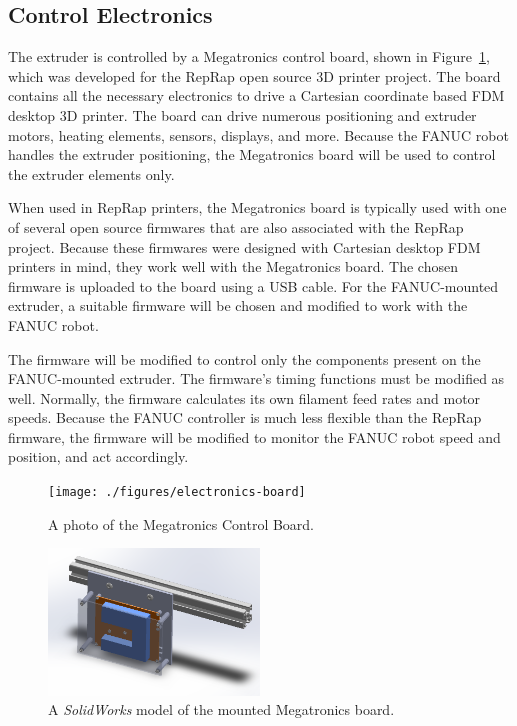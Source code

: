 \clearpage




\subsection{Control Electronics}
\indent 

The extruder is controlled by a Megatronics control board, shown in Figure~\ref{fig:megatronics}, which was developed for the RepRap open source 3D printer project. The board contains all the necessary electronics to drive a Cartesian coordinate based FDM desktop 3D printer. The board can drive numerous positioning and extruder motors, heating elements, sensors, displays, and more. Because the FANUC robot handles the extruder positioning, the Megatronics board will be used to control the extruder elements only. 

When used in RepRap printers, the Megatronics board is typically used with one of several open source firmwares that are also associated with the RepRap project. Because these firmwares were designed with Cartesian desktop FDM printers in mind, they work well with the Megatronics board. The chosen firmware is uploaded to the board using a USB cable. For the FANUC-mounted extruder, a suitable firmware will be chosen and modified to work with the FANUC robot.

The firmware will be modified to control only the components present on the FANUC-mounted extruder. The firmware's timing functions must be modified as well. Normally, the firmware calculates its own filament feed rates and motor speeds. Because the FANUC controller is much less flexible than the RepRap firmware, the firmware will be modified to monitor the FANUC robot speed and position, and act accordingly. 

\begin{figure}[htp]
\centering
\texttt{[image: ./figures/electronics-board]}
\caption{A photo of the Megatronics Control Board.}
\label{fig:megatronics}
\end{figure}

\begin{figure}[htp]
\centering
\includegraphics[width=0.5\textwidth]{./figures/megatronics-mount-1}
\caption{A \emph{SolidWorks} model of the mounted Megatronics board.}
\label{fig:megatronics mount back}
\end{figure}


